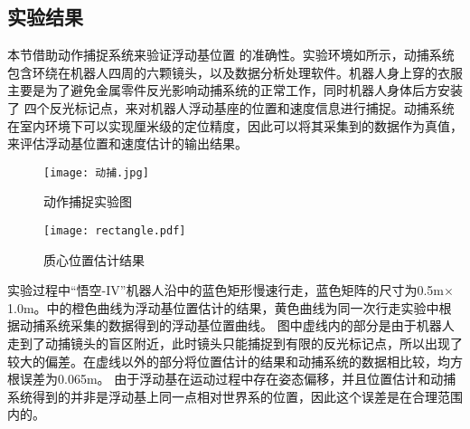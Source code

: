 \subsection{实验结果}
本节借助动作捕捉系统来验证浮动基位置%
的准确性。实验环境如所示，动捕系统包含环绕在机器人四周的六颗镜头，以及数据分析处理软件。机器人身上穿的衣服主要是为了避免金属零件反光影响动捕系统的正常工作，同时机器人身体后方安装了
四个反光标记点，来对机器人浮动基座的位置和速度信息进行捕捉。动捕系统在室内环境下可以实现厘米级的定位精度，因此可以将其采集到的数据作为真值，来评估浮动基位置和速度估计的输出结果。
\begin{figure}[htbp]
    \centering
    \texttt{[image: 动捕.jpg]}
    \caption{\label{fig:capture_exp}动作捕捉实验图}
\end{figure}
\begin{figure}[htbp]
    \centering
    \texttt{[image: rectangle.pdf]}
    \caption{\label{fig:com_pos_est}质心位置估计结果}
\end{figure}
实验过程中“悟空-IV”机器人沿中的蓝色矩形慢速行走，蓝色矩阵的尺寸为0.5m$\times$1.0m。中的橙色曲线为浮动基位置估计的结果，黄色曲线为同一次行走实验中根据动捕系统采集的数据得到的浮动基位置曲线。
图中虚线内的部分是由于机器人走到了动捕镜头的盲区附近，此时镜头只能捕捉到有限的反光标记点，所以出现了较大的偏差。在虚线以外的部分将位置估计的结果和动捕系统的数据相比较，均方根误差为0.065m。
由于浮动基在运动过程中存在姿态偏移，并且位置估计和动捕系统得到的并非是浮动基上同一点相对世界系的位置，因此这个误差是在合理范围内的。

